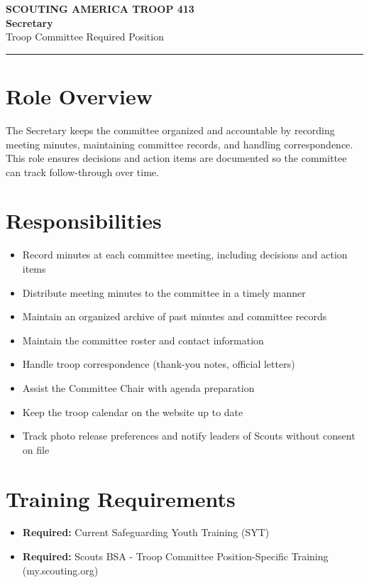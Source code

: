 \documentclass[11pt, letterpaper]{article}
\begin{document}
\begin{center}
  {\small\color{scoutgreen}\textbf{SCOUTING AMERICA \textbullet{} TROOP 413}} \\[4pt]
  {\fontsize{20pt}{24pt}\selectfont\bfseries\color{scoutgreen} Secretary} \\[4pt]
  {\large\color{accent} Troop Committee \textbullet{} Required Position} \\[4pt]
  \textcolor{accent}{\rule{0.6\linewidth}{1pt}}
\end{center}

\vspace{0.3em}

\begin{minipage}[t]{0.48\linewidth}
\raggedright

\section{Role Overview}
The Secretary keeps the committee organized and accountable by recording meeting minutes, maintaining committee records, and handling correspondence. This role ensures decisions and action items are documented so the committee can track follow-through over time.

\vspace{0.4em}
\section{Responsibilities}
\begin{itemize}
  \item Record minutes at each committee meeting, including decisions and action items
  \item Distribute meeting minutes to the committee in a timely manner
  \item Maintain an organized archive of past minutes and committee records
  \item Maintain the committee roster and contact information
  \item Handle troop correspondence (thank-you notes, official letters)
  \item Assist the Committee Chair with agenda preparation
  \item Keep the troop calendar on the website up to date
  \item Track photo release preferences and notify leaders of Scouts without consent on file
\end{itemize}

\section{Training Requirements}
\begin{itemize}
  \item \textbf{Required:} Current Safeguarding Youth Training (SYT)
  \item \textbf{Required:} Scouts BSA - Troop Committee Position-Specific Training (my.scouting.org)
\end{itemize}

\end{minipage}
\end{document}

